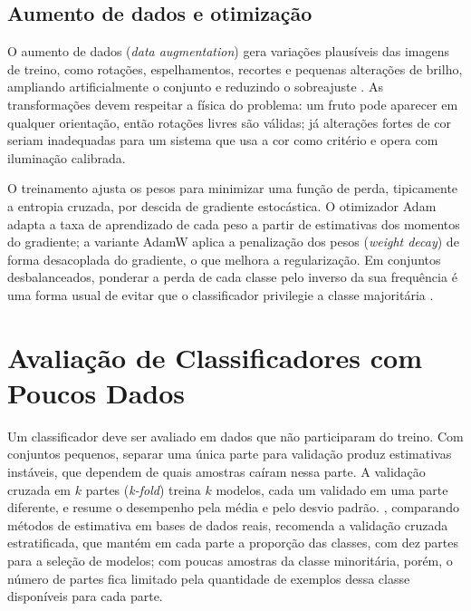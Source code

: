 \subsection{Aumento de dados e otimização}

O aumento de dados (\textit{data augmentation}) gera variações plausíveis das imagens de treino, como rotações, espelhamentos, recortes e pequenas alterações de brilho, ampliando artificialmente o conjunto e reduzindo o sobreajuste \cite{shorten2019}. As transformações devem respeitar a física do problema: um fruto pode aparecer em qualquer orientação, então rotações livres são válidas; já alterações fortes de cor seriam inadequadas para um sistema que usa a cor como critério e opera com iluminação calibrada.

O treinamento ajusta os pesos para minimizar uma função de perda, tipicamente a entropia cruzada, por descida de gradiente estocástica. O otimizador Adam \cite{kingma2015} adapta a taxa de aprendizado de cada peso a partir de estimativas dos momentos do gradiente; a variante AdamW \cite{loshchilov2019} aplica a penalização dos pesos (\textit{weight decay}) de forma desacoplada do gradiente, o que melhora a regularização. Em conjuntos desbalanceados, ponderar a perda de cada classe pelo inverso da sua frequência é uma forma usual de evitar que o classificador privilegie a classe majoritária \cite{he2009}.

\section{Avaliação de Classificadores com Poucos Dados}

Um classificador deve ser avaliado em dados que não participaram do treino. Com conjuntos pequenos, separar uma única parte para validação produz estimativas instáveis, que dependem de quais amostras caíram nessa parte. A validação cruzada em \(k\) partes (\textit{k-fold}) treina \(k\) modelos, cada um validado em uma parte diferente, e resume o desempenho pela média e pelo desvio padrão. \textcite{kohavi1995}, comparando métodos de estimativa em bases de dados reais, recomenda a validação cruzada estratificada, que mantém em cada parte a proporção das classes, com dez partes para a seleção de modelos; com poucas amostras da classe minoritária, porém, o número de partes fica limitado pela quantidade de exemplos dessa classe disponíveis para cada parte.

